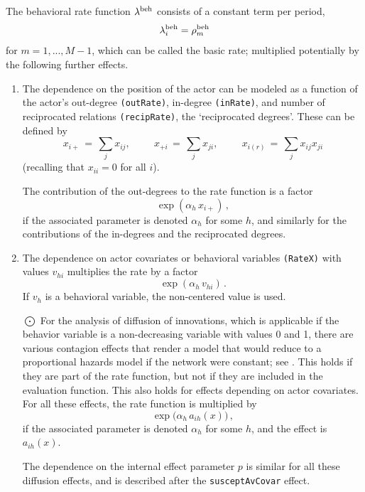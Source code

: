 \documentclass[a4paper,fleqn,11pt]{article}
\newcommand{\+}{\, + \,}
\begin{document}
The behavioral rate function $\lambda^{\rm beh}$ consists of a
constant term per period, \[ \lambda^{\rm beh}_{i} = \rho^{\rm
beh}_m \] for $m = 1, ..., M-1$, which can be called the basic rate;
multiplied potentially by the following further effects.
\begin{enumerate}
 \item The dependence on the position of the actor can be modeled
 as a function of the actor's out-degree \texttt{(outRate)},
 in-degree \texttt{(inRate)}, and number
 of reciprocated relations \texttt{(recipRate)}, the `reciprocated degrees'.
 These can be defined by
 \[ x_{i+} \,=\, \sum_j x_{ij}, \phantom{abcde} x_{+i} \,=\, \sum_j x_{ji},
                \phantom{abcde} x_{i(r)} \,=\, \sum_j x_{ij}x_{ji} \]
 (recalling that $x_{ii} = 0$ for all $i$).

The contribution of the out-degrees to the rate function
is a factor
 \[ \exp( \alpha_h \, x_{i+})\,, \]
if the associated parameter is denoted $\alpha_h$ for some $h$,
and similarly for the contributions of the in-degrees and the
reciprocated degrees.

 \item The dependence on actor covariates or behavioral variables
 \texttt{(RateX)} with values $v_{hi}$ multiplies the rate by a factor
 \[ \exp(\alpha_h \, v_{hi})\,. \]
   If $v_{h}$ is a behavioral variable, the non-centered value is used.


 \item[{\hspace*{-1ex}$\bigodot$}]
 For the analysis of diffusion of innovations,
  which is applicable if the behavior variable
  is a non-decreasing variable with values 0 and 1,
  there are various contagion effects that render a model that
  would reduce to a proportional hazards model if the network
  were constant; see \citet{Greenan15}.
  This holds if they are part of the rate function,
  but not if they are included in the evaluation function.
  This also holds for effects depending on actor covariates.
  For all these effects, the rate function is multiplied by
 \[ \exp\big( \alpha_h \, a_{ih}(x)\big)\,, \]
 if the associated parameter is denoted $\alpha_h$ for some $h$,
 and the effect is $a_{ih}(x)$.

 The dependence on the internal effect parameter $p$ is similar for all
 these diffusion effects, and is described after the
  \verb|susceptAvCovar| effect.


\end{enumerate}
\end{document}

